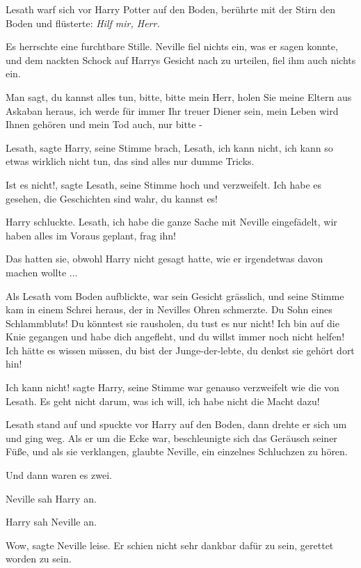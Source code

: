 Lesath warf sich vor Harry Potter auf den Boden, berührte mit der Stirn den
Boden und flüsterte: \emph{\glqq{}Hilf mir, Herr.\grqq{}}

Es herrschte eine furchtbare Stille. Neville fiel nichts ein, was er sagen
konnte, und dem nackten Schock auf Harrys Gesicht nach zu urteilen, fiel ihm
auch nichts ein.

\glqq{}Man sagt, du kannst alles tun, bitte, bitte mein Herr, holen Sie meine
Eltern aus Askaban heraus, ich werde für immer Ihr treuer Diener sein, mein
Leben wird Ihnen gehören und mein Tod auch, nur bitte -\grqq{}

\glqq{}Lesath\grqq{}, sagte Harry, seine Stimme brach, \glqq{}Lesath, ich kann
nicht, ich kann so etwas wirklich nicht tun, das sind alles nur dumme
Tricks.\grqq{}

\glqq{}Ist es nicht!\grqq{}, sagte Lesath, seine Stimme hoch und verzweifelt.
\glqq{}Ich habe es gesehen, die Geschichten sind wahr, du kannst es!\grqq{}

Harry schluckte. \glqq{}Lesath, ich habe die ganze Sache mit Neville
eingefädelt, wir haben alles im Voraus geplant, frag ihn!\grqq{}

Das hatten sie, obwohl Harry nicht gesagt hatte, wie er irgendetwas davon machen
wollte ...

Als Lesath vom Boden aufblickte, war sein Gesicht grässlich, und seine Stimme
kam in einem Schrei heraus, der in Nevilles Ohren schmerzte. \glqq{}Du Sohn
eines Schlammbluts! Du könntest sie rausholen, du tust es nur nicht! Ich bin auf
die Knie gegangen und habe dich angefleht, und du willst immer noch nicht
helfen! Ich hätte es wissen müssen, du bist der Junge-der-lebte, du denkst sie
gehört dort hin!\grqq{}

\glqq{}Ich kann nicht!\grqq{} sagte Harry, seine Stimme war genauso verzweifelt
wie die von Lesath. \glqq{}Es geht nicht darum, was ich will, ich habe nicht die
Macht dazu!\grqq{}

Lesath stand auf und spuckte vor Harry auf den Boden, dann drehte er sich um und
ging weg. Als er um die Ecke war, beschleunigte sich das Geräusch seiner Füße,
und als sie verklangen, glaubte Neville, ein einzelnes Schluchzen zu hören.

Und dann waren es zwei.

Neville sah Harry an.

Harry sah Neville an.

\glqq{}Wow\grqq{}, sagte Neville leise. \glqq{}Er schien nicht sehr dankbar
dafür zu sein, gerettet worden zu sein.\grqq{}

